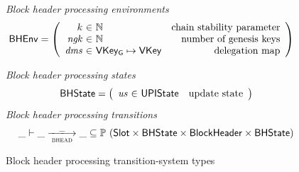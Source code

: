 \documentclass[11pt,a4paper]{article}
\newcommand{\powerset}[1]{\mathbb{P}~#1}
\newcommand{\var}[1]{\mathit{#1}}
\newcommand{\type}[1]{\mathsf{#1}}
\newcommand{\trans}[2]{\xlongrightarrow[\textsc{#1}]{#2}}
\newcommand{\Slot}{\type{Slot}}
\newcommand{\VKey}{\type{VKey}}
\newcommand{\VKeyGen}{\type{VKey_G}}
\begin{document}
\begin{figure}[ht]
  \emph{Block header processing environments}
  \begin{align*}
    & \BHEnv
      = \left(
      \begin{array}{r@{~\in~}lr}
        k & \mathbb{N} & \text{chain stability parameter}\\
        \var{ngk} & \mathbb{N} & \text{number of genesis keys}\\
        \var{dms} & \VKeyGen \mapsto \VKey & \text{delegation map}\\
      \end{array}\right)
  \end{align*}

  \emph{Block header processing states}
  \begin{equation*}
    \BHState =
    \left(
      \begin{array}{r@{~\in~}lr}
        \var{us} & \UPIState & \text{update state}
      \end{array}
    \right)
  \end{equation*}
  \emph{Block header processing transitions}
  \begin{equation*}
    \var{\_} \vdash \var{\_} \trans{bhead}{\_} \var{\_} \subseteq
    \powerset (\Slot \times \BHState \times \Bhead \times \BHState)
  \end{equation*}
  \caption{Block header processing transition-system types}
  \label{fig:ts-types:bhead}
\end{figure}
\end{document}
